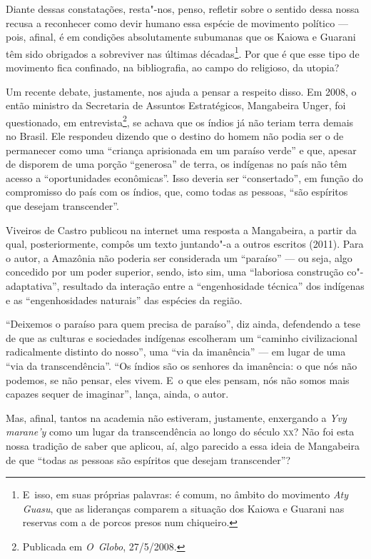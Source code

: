 Diante dessas constatações, resta"-nos, penso, refletir sobre o sentido
dessa nossa recusa a reconhecer como devir humano essa espécie de
movimento político --- pois, afinal, é em condições absolutamente
subumanas que os Kaiowa e Guarani têm sido obrigados a sobreviver nas
últimas décadas\footnote{E~isso, em suas próprias palavras: é comum, no
âmbito do movimento \emph{Aty Guasu}, que as lideranças comparem a situação
dos Kaiowa e Guarani nas reservas com a de porcos presos num
chiqueiro.}. Por que é que esse tipo de movimento fica confinado, na
bibliografia, ao campo do religioso, da utopia?

Um recente debate, justamente, nos ajuda a pensar a respeito disso. Em
2008, o então ministro da Secretaria de Assuntos Estratégicos,
Mangabeira Unger, foi questionado, em entrevista\footnote{Publicada em
\emph{O~Globo}, 27/5/2008.}, se achava que os índios já não teriam terra
demais no Brasil. Ele respondeu dizendo que o destino do homem não
podia ser o de permanecer como uma ``criança aprisionada em um paraíso
verde'' e que, apesar de disporem de uma porção ``generosa'' de terra, os
indígenas no país não têm acesso a ``oportunidades econômicas''. Isso
deveria ser ``consertado'', em função do compromisso do país com os
índios, que, como todas as pessoas, ``são espíritos que desejam
transcender''.

Viveiros de Castro publicou na internet uma resposta a Mangabeira, a
partir da qual, posteriormente, compôs um texto juntando"-a a outros
escritos (2011). Para o autor, a Amazônia não poderia ser considerada
um ``paraíso'' --- ou seja, algo concedido por um poder superior, sendo,
isto sim, uma ``laboriosa construção co"-adaptativa'', resultado da
interação entre a ``engenhosidade técnica'' dos indígenas e as
``engenhosidades naturais'' das espécies da região. 

``Deixemos o paraíso para quem precisa de paraíso'', diz ainda, defendendo
a tese de que as culturas e sociedades indígenas escolheram um ``caminho
civilizacional radicalmente distinto do nosso'', uma ``via da imanência''
--- em lugar de uma ``via da transcendência''. ``Os índios são os senhores
da imanência: o que nós não podemos, se não pensar, eles vivem. E~o que
eles pensam, nós não somos mais capazes sequer de imaginar'', lança,
ainda, o autor.

Mas, afinal, tantos na academia não estiveram, justamente, enxergando a
\emph{Yvy marane’y} como um lugar da transcendência ao longo do século \textsc{xx}? Não
foi esta nossa tradição de saber que aplicou, aí, algo parecido a essa
ideia de Mangabeira de que ``todas as pessoas são espíritos que desejam
transcender''?

